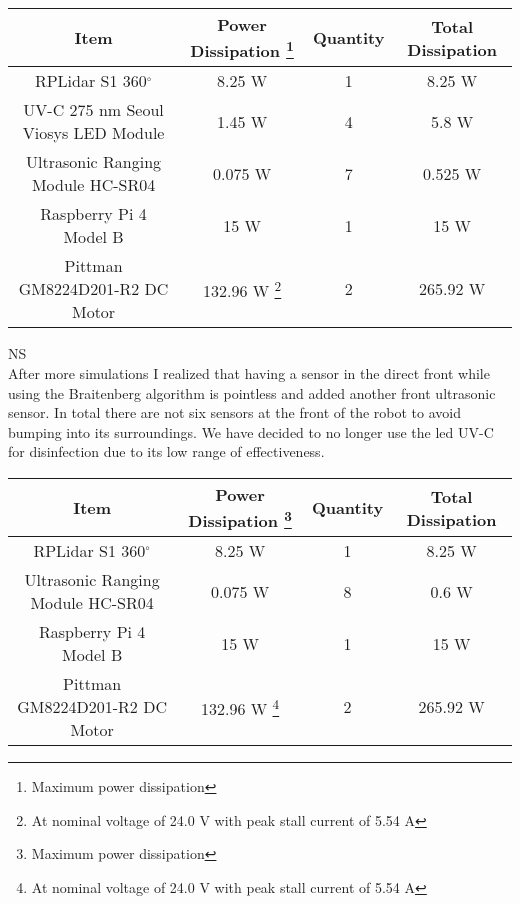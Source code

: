 \documentclass[fontsize=11pt, %
                             paper=a4, %
                             twoside, %
                             captions=tableheading,
                             index=totoc,
                             hyperref]{labbook}
\begin{document}
\begin{addmargin}[0cm]{0cm}
\begin{minipage}{16cm}
\begin{center}
\begin{tabular}{|c|c|c|c|}
\hline
Item & Power Dissipation \footnote{Maximum power dissipation} & Quantity & Total Dissipation \\
\hline
RPLidar S1 360$^\circ$ & 8.25 W & 1 & 8.25 W\\
\hline
UV-C 275 nm Seoul Viosys LED Module & 1.45 W & 4 & 5.8 W\\
\hline
Ultrasonic Ranging Module HC-SR04 & 0.075 W & 7 & 0.525 W\\
\hline
Raspberry Pi 4 Model B & 15 W & 1 & 15 W\\
\hline
Pittman GM8224D201-R2 DC Motor & 132.96 W \footnote{At nominal voltage of 24.0 V with peak stall current of 5.54 A} & 2 & 265.92 W\\
\hline
\end{tabular}
\end{center}
\end{minipage}

NS\\
After more simulations I realized that having a sensor in the direct front while using the Braitenberg algorithm is pointless and added another front ultrasonic sensor. In total there are not six sensors at the front of the robot to avoid bumping into its surroundings. We have decided to no longer use the led UV-C for disinfection due to its low range of effectiveness.

\begin{minipage}{16cm}
\begin{center}
\begin{tabular}{|c|c|c|c|}
\hline
Item & Power Dissipation \footnote{Maximum power dissipation} & Quantity & Total Dissipation \\
\hline
RPLidar S1 360$^\circ$ & 8.25 W & 1 & 8.25 W\\
\hline
Ultrasonic Ranging Module HC-SR04 & 0.075 W & 8 & 0.6 W\\
\hline
Raspberry Pi 4 Model B & 15 W & 1 & 15 W\\
\hline
Pittman GM8224D201-R2 DC Motor & 132.96 W \footnote{At nominal voltage of 24.0 V with peak stall current of 5.54 A} & 2 & 265.92 W\\
\hline
\end{tabular}
\end{center}
\end{minipage}


\end{addmargin}
\end{document}
